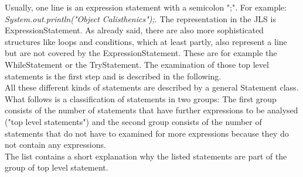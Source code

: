 Usually, one line is an expression statement with a semicolon ";". For example: \textit{System.out.println("Object Calisthenics");}. The representation in the \acf{JLS} is ExpressionStatement. As already said, there are also more sophisticated structures like loops and conditions, which at least partly, also represent a line but are not covered by the ExpressionStatement. These are for example the WhileStatement or the TryStatement. The examination of those top level statements is the first step and is described in the following.
\\

All these different kinds of statements are described by a general Statement class. What follows is a classification of statements in two groups: The first group consists of the number of statements that have further expressions to be analysed ("top level statements") and the second group consists of the number of statements that do not have to examined for more expressions because they do not contain any expressions. 
\\

The list contains a short explanation why the listed statements are part of the group of top level statement.
\\


